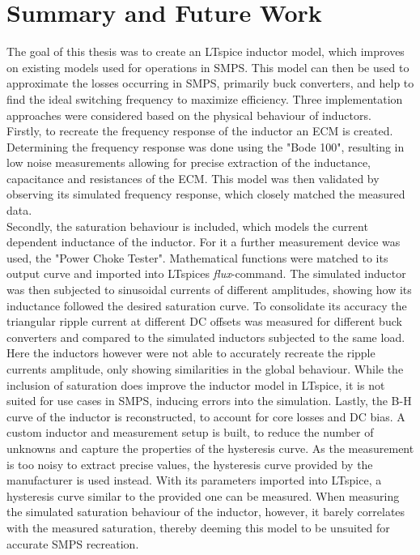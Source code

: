 \chapter{Summary and  Future Work} \label{sec:ausblick}
The goal of this thesis was to create an LTspice inductor model, which improves on existing models used for operations in \ac{SMPS}. This model can then be used to approximate the losses occurring in \ac{SMPS}, primarily buck converters, and help to find the ideal switching frequency to maximize efficiency. Three implementation approaches were considered based on the physical behaviour of inductors.\\
Firstly, to recreate the frequency response of the inductor an \ac{ECM} is created. Determining the frequency response was done using the "Bode 100", resulting in low noise measurements allowing for precise extraction of the inductance, capacitance and resistances of the \ac{ECM}. This model was then validated by observing its simulated frequency response, which closely matched the measured data. \\
Secondly, the saturation behaviour is included, which models the current dependent inductance of the inductor. For it a further measurement device was used, the "Power Choke Tester". Mathematical functions were matched to its output curve and imported into LTspices \textit{flux}-command. The simulated inductor was then subjected to sinusoidal currents of different amplitudes, showing how its inductance followed the desired saturation curve. To consolidate its accuracy the triangular ripple current at different \ac{DC} offsets was measured for different buck converters and compared to the simulated inductors subjected to the same load. Here the inductors however were not able to accurately recreate the ripple currents amplitude, only showing similarities in the global behaviour. While the inclusion of saturation does improve the inductor model in LTspice, it is not suited for use cases in \ac{SMPS}, inducing errors into the simulation. 
Lastly, the B-H curve of the inductor is reconstructed, to account for core losses and \ac{DC} bias. A custom inductor and measurement setup is built, to reduce the number of unknowns and capture the properties of the hysteresis curve. As the measurement is too noisy to extract precise values, 
the hysteresis curve provided by the manufacturer is used instead. With its parameters imported into LTspice, a hysteresis curve similar to the provided one can be measured. When measuring the simulated saturation behaviour of the inductor, however, it barely correlates with the measured saturation, thereby deeming this model to be unsuited for accurate \ac{SMPS} recreation.\\

